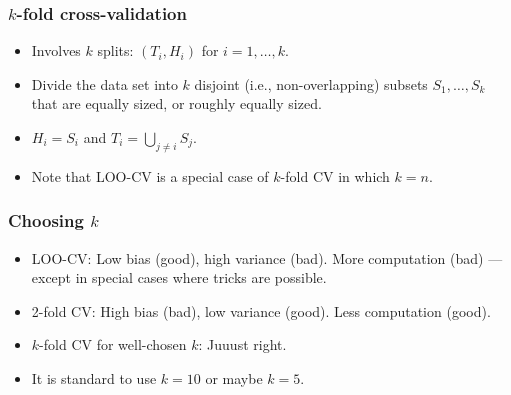 \documentclass[12pt]{article}
\begin{document}
\subsubsection*{$k$-fold cross-validation}
\begin{itemize}
\item Involves $k$ splits: $(T_i,H_i)$ for $i = 1,\ldots,k$.
\item Divide the data set into $k$ disjoint (i.e., non-overlapping) subsets $S_1,\ldots,S_k$ that are equally sized, or roughly equally sized. 
\item $H_i = S_i$ and $T_i = \bigcup_{j\neq i} S_j$.
\item Note that LOO-CV is a special case of $k$-fold CV in which $k = n$.
\end{itemize}

\subsubsection*{Choosing $k$}
\begin{itemize}
\item LOO-CV: Low bias (good), high variance (bad). More computation (bad) --- except in special cases where tricks are possible.
\item 2-fold CV: High bias (bad), low variance (good). Less computation (good).
\item $k$-fold CV for well-chosen $k$: Juuust right.
\item It is standard to use $k = 10$ or maybe $k = 5$.
\end{itemize}
\end{document}
